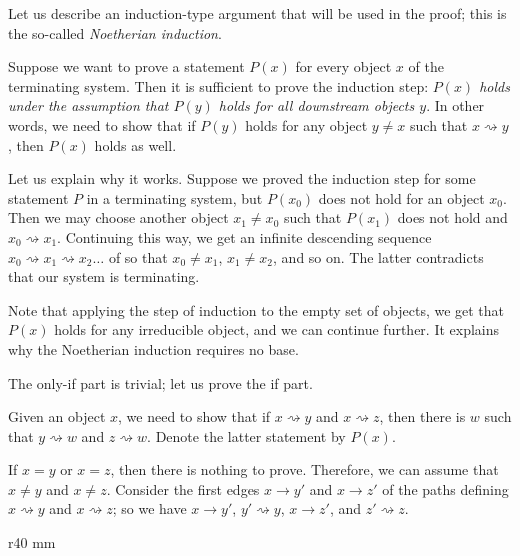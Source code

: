 Let us describe an induction-type argument that will be used in the proof;
this is the so-called \emph{Noetherian induction}.

Suppose we want to prove a statement $P(x)$ for every object $x$ of the terminating system.
Then it is sufficient to prove the induction step:
\textit{$P(x)$ holds under the assumption that $P(y)$ holds for all downstream objects $y$}.
In other words, we need to show that if $P(y)$ holds for any object $y\ne x$ such that $x\rightsquigarrow y$, then $P(x)$ holds as well.

Let us explain why it works.
Suppose we proved the induction step for some statement $P$ in a terminating system, but $P(x_0)$ does not hold for an object $x_0$.
Then we may choose another object $x_1\ne x_0$ such that $P(x_1)$ does not hold and $x_0\rightsquigarrow x_1$.
Continuing this way, we get an infinite descending sequence $x_0\rightsquigarrow x_1\rightsquigarrow x_2\dots$ of so that $x_0\ne x_1$, $x_1\ne x_2$, and so on.
The latter contradicts that our system is terminating.

Note that applying the step of induction to the empty set of objects,
we get that $P(x)$ holds for any irreducible object, and we can continue further.
It explains why the Noetherian induction requires no base.

The only-if part is trivial;
let us prove the if part.

Given an object $x$, we need to show that if $x\rightsquigarrow y$ and $x\rightsquigarrow  z$, then there is $w$ such that $y\rightsquigarrow w$ and $z\rightsquigarrow  w$.
Denote the latter statement by $P(x)$.

If $x=y$ or $x=z$, then there is nothing to prove.
Therefore, we can assume that $x\ne y$ and $x\ne z$.
Consider the first edges $x\to y'$ and $x \to z'$ of the paths defining $x\rightsquigarrow y$ and $x\rightsquigarrow  z$; 
so we have $x\to y'$, $y' \rightsquigarrow  y$, $x \to z'$, and $z' \rightsquigarrow  z$.

\begin{wrapfigure}[9]{r}{40 mm}
\vskip-6mm
\centering
{}
\vskip-0mm
\end{wrapfigure}

